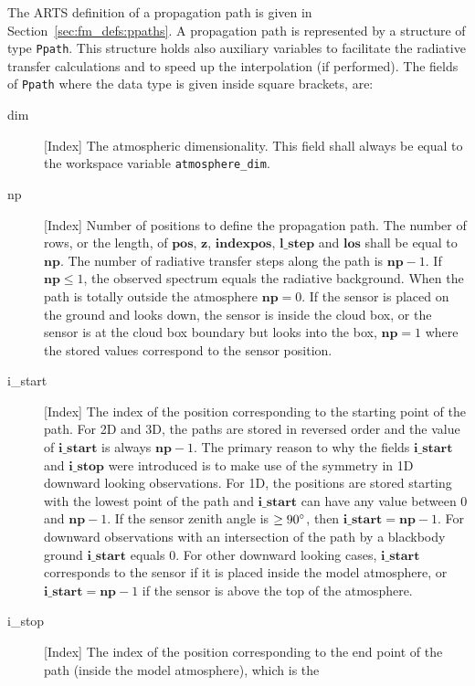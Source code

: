 The ARTS definition of a propagation path is given in
Section~\ref{sec:fm_defs:ppaths}.  A propagation path is represented by
a structure of type \verb|Ppath|. This structure holds also
auxiliary variables to facilitate the radiative transfer calculations
and to speed up the interpolation (if performed). The fields of \verb|Ppath|
where the data type is given inside square
brackets, are:
\begin{description}
  \item[dim] [Index] The atmospheric dimensionality. This field shall always 
     be equal to the workspace variable \verb|atmosphere_dim|.
  \item[np] [Index] Number of positions to define the propagation path. The 
     number of rows, or the length, of $\mathbf{pos}$, $\mathbf{z}$, 
     $\mathbf{indexpos}$, $\mathbf{l\_step}$ and $\mathbf{los}$ shall be
     equal to $\mathbf{np}$. The number of radiative transfer steps along the 
     path is $\mathbf{np}-1$. If $\mathbf{np}\leq 1$, the observed spectrum 
     equals the radiative background. When the path is totally outside the 
     atmosphere $\mathbf{np}=0$. If the sensor is placed on the ground and 
     looks down, the sensor is inside the cloud box, or the sensor is at the 
     cloud box boundary but looks into the box, $\mathbf{np}=1$ where the 
     stored values correspond to the sensor position.
  \item[i\_start] [Index] The index of the position corresponding to the 
     starting point of the path. For 2D and 3D, the paths are stored in
     reversed order and the value of $\mathbf{i\_start}$ is always 
     $\mathbf{np}-1$. The primary reason to why the fields $\mathbf{i\_start}$
     and $\mathbf{i\_stop}$ were introduced is to make use of the symmetry
     in 1D downward looking observations. For 1D, the positions are stored 
     starting with the lowest point of the path and $\mathbf{i\_start}$ can
     have any value between 0 and $\mathbf{np}-1$. If the sensor zenith angle
     is $\geq 90^\circ$, then $\mathbf{i\_start} = \mathbf{np}-1$. For
     downward observations with an intersection of the path by a blackbody 
     ground $\mathbf{i\_start}$ equals 0. For other downward looking cases,
     $\mathbf{i\_start}$ corresponds to the sensor if it is placed inside
     the model atmosphere, or $\mathbf{i\_start} = \mathbf{np}-1$ if the
     sensor is above the top of the atmosphere.
  \item[i\_stop] [Index] The index of the position corresponding to the 
     end point of the path (inside the model atmosphere), which is the 

\end{description}

